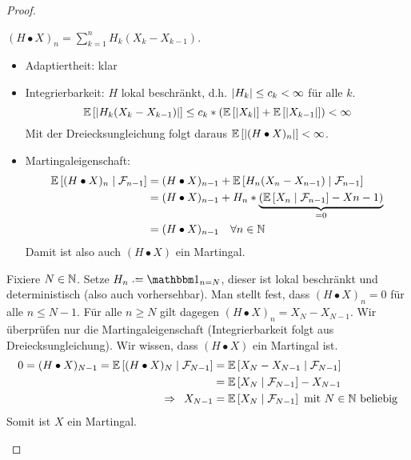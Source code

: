 \begin{proof}
    \begin{equivalence}
        \hinrichtung $(H \bullet X)_n = \sum_{k=1}^n H_k (X_k - X_{k-1})$.
        \begin{itemize}
            \item Adaptiertheit: klar
            \item Integrierbarkeit: $H$ lokal beschränkt, d.h. $\left| H_k \right| \le c_k < \infty$ für alle $k$.
            \begin{equation*}
                \mathbb{E} \left[ \left| H_k (X_k - X_{k-1}) \right| \right] \le c_k * \left( \mathbb{E} \left[ \left| X_k \right| \right] + \mathbb{E} \left[ \left| X_{k-1} \right| \right] \right) < \infty
            \end{equation*}
            Mit der Dreiecksungleichung folgt daraus $\mathbb{E} \left[ \left| (H \bullet X)_n \right| \right] < \infty$.
            \item Martingaleigenschaft: 
            \begin{equation*}
                \begin{aligned}
                    \mathbb{E} \left[ (H \bullet X)_n \mid \mathcal{F}_{n-1} \right] &
                    = (H \bullet X)_{n-1} + \mathbb{E} \left[ H_n (X_n - X_{n-1}) \mid \mathcal{F}_{n-1} \right] \\
                    & = (H \bullet X)_{n-1} + H_n * \underbrace{\left( \mathbb{E} \left[ X_n \mid \mathcal{F}_{n-1} \right] - X{n-1} \right)}_{=0} \\
                    & = (H \bullet X)_{n-1} \quad \forall n \in \mathbb{N}
                \end{aligned}
            \end{equation*}
            Damit ist also auch $(H \bullet X)$ ein Martingal.		
        \end{itemize}
        \rueckrichtung Fixiere $N \in \mathbb{N}$. Setze $H_n \defeq \one_{n = N}$, dieser ist lokal beschränkt und deterministisch (also auch vorhersehbar). Man stellt fest, dass $(H \bullet X)_n = 0$ für alle $n \le N-1$. Für alle $n \ge N$ gilt dagegen $(H \bullet X)_n = X_N - X_{N-1}$. Wir überprüfen nur die Martingaleigenschaft (Integrierbarkeit folgt aus Dreiecksungleichung). Wir wissen, dass $(H \bullet X)$ ein Martingal ist. 
        \begin{align*}
            0 = (H \bullet X)_{N-1} 
            = \mathbb{E} \left[ (H \bullet X)_N \mid \mathcal{F}_{N-1} \right]
            & = \mathbb{E} \left[ X_N - X_{N-1} \mid \mathcal{F}_{N-1} \right] \\
            & = \mathbb{E} \left[ X_N \mid \mathcal{F}_{N-1} \right] - X_{N-1} \\
            \enskip \Rightarrow \enskip X_{N-1} &= \mathbb{E} \left[ X_N \mid \mathcal{F}_{N-1} \right] \text{ mit } N \in \mathbb{N} \text{ beliebig}
        \end{align*}
        Somit ist $X$ ein Martingal.
    \end{equivalence}
\end{proof}

